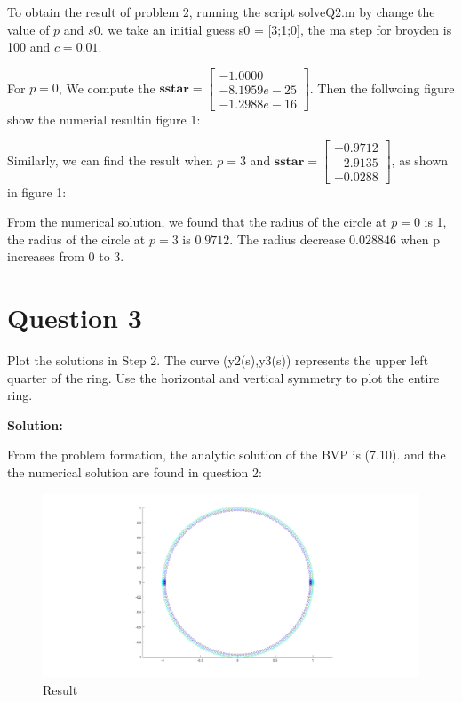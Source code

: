 \documentclass{article}
\begin{document}
To obtain the result of problem 2, running the script solveQ2.m by change the value of $p$ and $s0$. we take an initial guess s0 = [3;1;0], the ma step for broyden is 100 and  $c=0.01$.

 For $p=0$, We compute the $\mathbf{sstar}=\left[\begin{array}{l}
	-1.0000 \\
	-8.1959e-25 \\
	-1.2988e-16
\end{array}\right]
$. Then the follwoing figure show the numerial resultin figure 1:


Similarly, we can find the result when $p=3$ and $\mathbf{sstar}=\left[\begin{array}{l}
	-0.9712 \\
	-2.9135 \\
	-0.0288
\end{array}\right]
$, as shown in figure 1:

From the numerical solution, we found that the radius of the circle at $p=0$ is 1, the radius of the circle at $p=3$ is $0.9712$. The radius decrease \textbf{$0.028846$} when p increases from 0 to 3.



\section*{Question 3} 

Plot the solutions in Step 2. The curve (y2(s),y3(s)) represents the upper left quarter of the
ring. Use the horizontal and vertical symmetry to plot the entire ring.


\textbf{Solution:} 

From the problem formation, the analytic solution of the BVP is (7.10). and the the numerical solution are found in question 2:

\begin{figure}[htbp]  %
	\centering    %
	\centering          %
	\includegraphics[width=1\textwidth]{fig/Q3-NEW.png}   %
	\caption{Result} 
	\label{fig1}  %
\end{figure}
\end{document}

